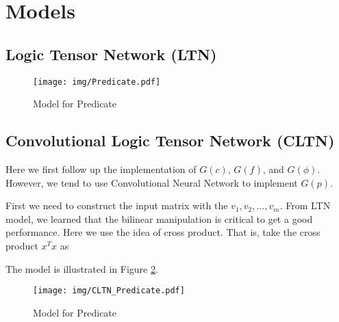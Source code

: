 
\section{Models}

\subsection{Logic Tensor Network (LTN)}

\begin{figure}
    \centering
    \texttt{[image: img/Predicate.pdf]}
    \caption{Model for Predicate}
    \label{fig:LTN_predicate}
\end{figure}

\subsection{Convolutional Logic Tensor Network (CLTN)}

Here we first follow up the implementation of $G(c)$, $G(f)$, and $G(\phi)$. However, we tend to use Convolutional Neural Network to implement $G(p)$.

First we need to construct the input matrix with the $v_1,v_2,\dots,v_m$. From LTN model, we learned that the bilinear manipulation is critical to get a good performance. Here we use the idea of cross product. That is, take the cross product $x^Tx$ as

The model is illustrated in Figure \ref{fig:CLTN_predicate}.

\begin{figure}
    \centering
    \texttt{[image: img/CLTN\_Predicate.pdf]}
    \caption{Model for Predicate}
    \label{fig:CLTN_predicate}
\end{figure}
